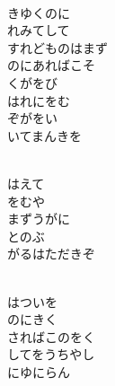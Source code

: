 \documentclass[10pt,b5j]{tarticle} %
\begin{document}
\vspace{1.5em} %
\newcommand{\linespace}{0.5em} %
\newcommand{\blocksize}{0.5\hsize} %
\newcommand{\itemmargin}{6em} %
\begin{enumerate} %
    \setlength{\itemindent}{\itemmargin} %
    \begin{minipage}[c]{\blocksize}
    
        \vspace{\linespace}
        \item~\\
        きゆくのに\\
        れみてして\\
        すれどものはまず\\
        のにあればこそ\\
        くがをび\\
        はれにをむ\\
        ぞがをい\\
        いてまんきを
        
        \vspace{\linespace}
        \item~\\
        はえて\\
        をむや\\
        まずうがに\\
        とのぶ\\
        がるはただきぞ
        
        \vspace{\linespace}
        \item~\\
        はついを\\
        のにきく\\
        さればこのをく\\
        してをうちやし\\
        にゆにらん
        

\end{minipage}
\end{enumerate}
\end{document}
